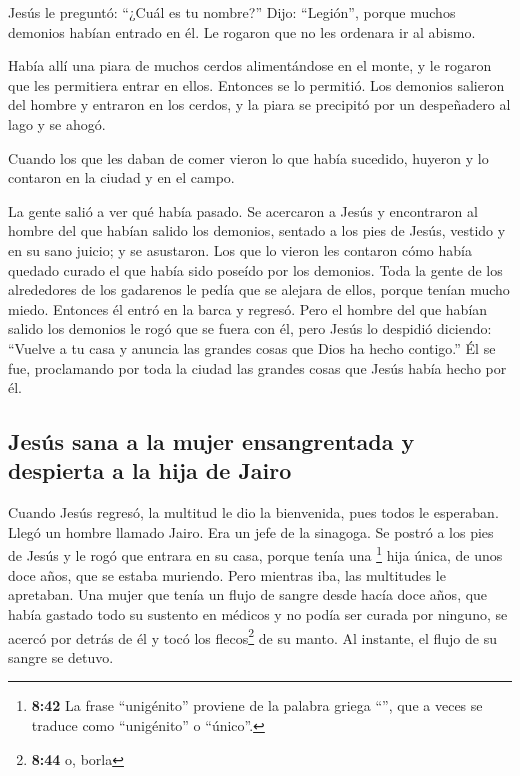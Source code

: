  Jesús le preguntó: ``¿Cuál es tu nombre?'' Dijo:
``Legión'', porque muchos demonios habían entrado en él. 
Le rogaron que no les ordenara ir al abismo.

 Había allí una piara de muchos cerdos alimentándose en
el monte, y le rogaron que les permitiera entrar en ellos. Entonces se
lo permitió.  Los demonios salieron del hombre y entraron
en los cerdos, y la piara se precipitó por un despeñadero al lago y se
ahogó.

 Cuando los que les daban de comer vieron lo que había
sucedido, huyeron y lo contaron en la ciudad y en el campo.

 La gente salió a ver qué había pasado. Se acercaron a
Jesús y encontraron al hombre del que habían salido los demonios,
sentado a los pies de Jesús, vestido y en su sano juicio; y se
asustaron.  Los que lo vieron les contaron cómo había
quedado curado el que había sido poseído por los demonios.
 Toda la gente de los alrededores de los gadarenos le
pedía que se alejara de ellos, porque tenían mucho miedo. Entonces él
entró en la barca y regresó.  Pero el hombre del que
habían salido los demonios le rogó que se fuera con él, pero Jesús lo
despidió diciendo:  ``Vuelve a tu casa y anuncia las
grandes cosas que Dios ha hecho contigo.'' Él se fue, proclamando por
toda la ciudad las grandes cosas que Jesús había hecho por él.

\hypertarget{jesuxfas-sana-a-la-mujer-ensangrentada-y-despierta-a-la-hija-de-jairo}{%
\subsection{Jesús sana a la mujer ensangrentada y despierta a la hija de
Jairo}\label{jesuxfas-sana-a-la-mujer-ensangrentada-y-despierta-a-la-hija-de-jairo}}

 Cuando Jesús regresó, la multitud le dio la bienvenida,
pues todos le esperaban.  Llegó un hombre llamado Jairo.
Era un jefe de la sinagoga. Se postró a los pies de Jesús y le rogó que
entrara en su casa,  porque tenía una \footnote{\textbf{8:42}
  La frase ``unigénito'' proviene de la palabra griega
  ``'', que a veces se traduce como ``unigénito'' o
  ``único''.} hija única, de unos doce años, que se estaba muriendo.
Pero mientras iba, las multitudes le apretaban.  Una
mujer que tenía un flujo de sangre desde hacía doce años, que había
gastado todo su sustento en médicos y no podía ser curada por ninguno,
 se acercó por detrás de él y tocó los flecos\footnote{\textbf{8:44}
  o, borla} de su manto. Al instante, el flujo de su sangre se detuvo.

